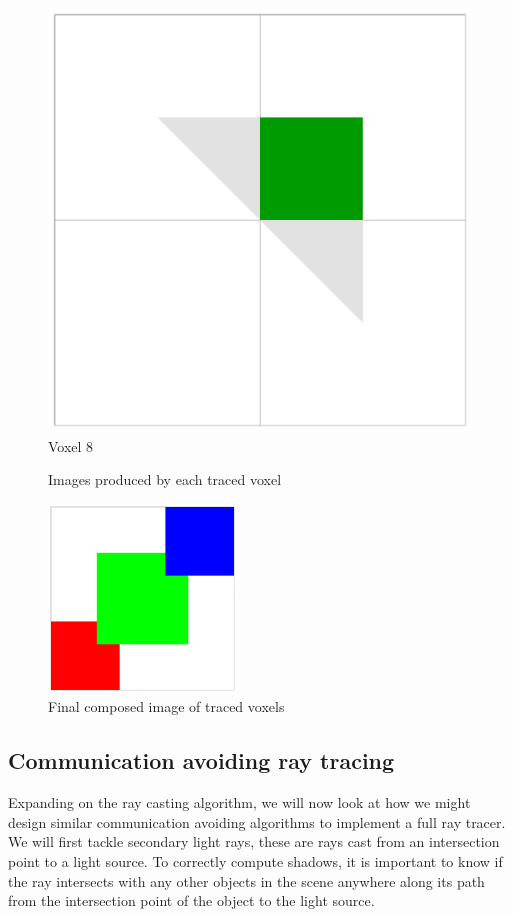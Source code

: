 \begin{figure}[!htb]
  \includegraphics[width=\linewidth]{drawings/cubes_08.pdf}
  Voxel 8
\endminipage
\caption{Images produced by each traced voxel}
\label{fig:cubes}
\end{figure}

\begin{figure}[!htb]
\centering
  \includegraphics[height=5cm]{drawings/cube_final.pdf}
\caption{Final composed image of traced voxels}
\label{fig:cubes_final}
\end{figure}


\subsection{Communication avoiding ray tracing}
\label{sec:ca-ray-tracing}

Expanding on the ray casting algorithm, we will now look at how we might design 
similar communication avoiding algorithms to implement a full ray tracer.  We 
will first tackle secondary light rays, these are rays cast from an intersection
point to a light source.  To correctly compute shadows, it is important to know 
if the ray intersects with any other objects in the scene anywhere along its 
path from the intersection point of the object to the light source.  

